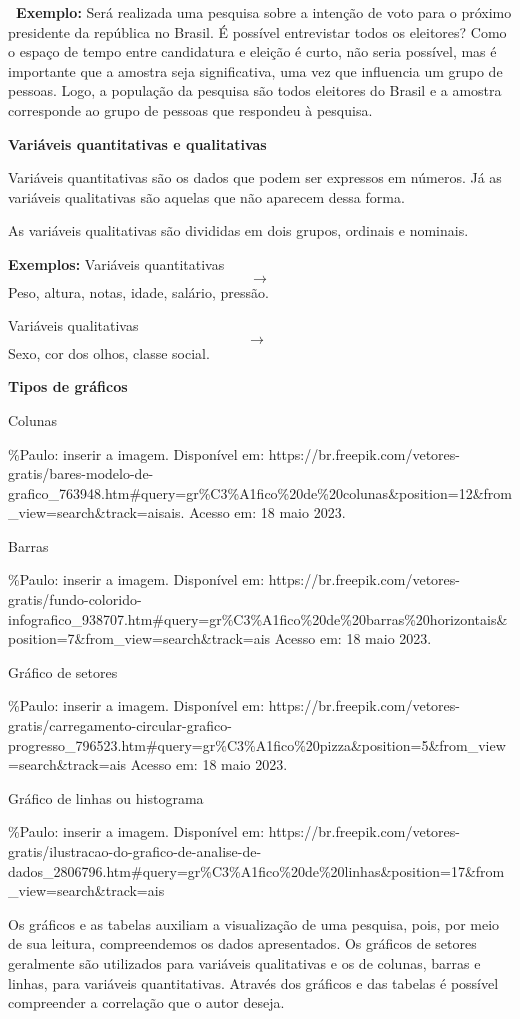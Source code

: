 \textbf{~Exemplo:} Será realizada uma pesquisa sobre a intenção de voto
para o próximo presidente da república no Brasil. É possível entrevistar
todos os eleitores? Como o espaço de tempo entre candidatura e eleição é
curto, não seria possível, mas é importante que a amostra seja
significativa, uma vez que influencia um grupo de pessoas. Logo, a
população da pesquisa são todos eleitores do Brasil e a amostra
corresponde ao grupo de pessoas que respondeu à pesquisa.

\textbf{Variáveis quantitativas e qualitativas~}

Variáveis quantitativas são os dados que podem ser expressos em números.
Já as variáveis qualitativas são aquelas que não aparecem dessa forma.

As variáveis qualitativas são divididas em dois grupos, ordinais e
nominais.

\textbf{Exemplos:} Variáveis quantitativas \[\rightarrow\] Peso, altura,
notas, idade, salário, pressão.

Variáveis qualitativas \[\rightarrow \ \ \]Sexo, cor dos olhos, classe
social.

\textbf{Tipos de gráficos}

Colunas

\%Paulo: inserir a imagem. Disponível em:
https://br.freepik.com/vetores-gratis/bares-modelo-de-grafico\_763948.htm\#query=gr\%C3\%A1fico\%20de\%20colunas\&position=12\&from\_view=search\&track=aisais.
Acesso em: 18 maio 2023.

Barras

\%Paulo: inserir a imagem. Disponível em:
https://br.freepik.com/vetores-gratis/fundo-colorido-infografico\_938707.htm\#query=gr\%C3\%A1fico\%20de\%20barras\%20horizontais\&position=7\&from\_view=search\&track=ais
Acesso em: 18 maio 2023.

Gráfico de setores

\%Paulo: inserir a imagem. Disponível em:
https://br.freepik.com/vetores-gratis/carregamento-circular-grafico-progresso\_796523.htm\#query=gr\%C3\%A1fico\%20pizza\&position=5\&from\_view=search\&track=ais
Acesso em: 18 maio 2023.

Gráfico de linhas ou histograma

\%Paulo: inserir a imagem. Disponível em:
https://br.freepik.com/vetores-gratis/ilustracao-do-grafico-de-analise-de-dados\_2806796.htm\#query=gr\%C3\%A1fico\%20de\%20linhas\&position=17\&from\_view=search\&track=ais

Os gráficos e as tabelas auxiliam a visualização de uma pesquisa, pois,
por meio de sua leitura, compreendemos os dados apresentados. Os
gráficos de setores geralmente são utilizados para variáveis
qualitativas e os de colunas, barras e linhas, para variáveis
quantitativas. Através dos gráficos e das tabelas é possível compreender
a correlação que o autor deseja.~

